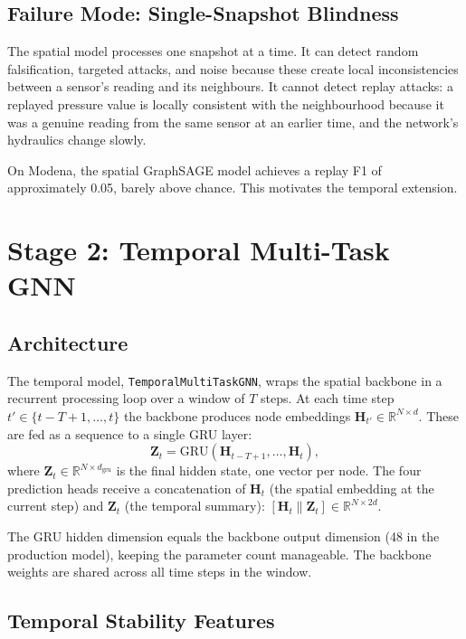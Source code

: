 \subsection{Failure Mode: Single-Snapshot Blindness}

The spatial model processes one snapshot at a time. It can detect
random falsification, targeted attacks, and noise because these
create local inconsistencies between a sensor's reading and its
neighbours. It cannot detect replay attacks: a replayed pressure
value is locally consistent with the neighbourhood because it was a
genuine reading from the same sensor at an earlier time, and the
network's hydraulics change slowly.

On Modena, the spatial GraphSAGE model achieves a replay F1
of approximately 0.05, barely above chance. This motivates the
temporal extension.

\section{Stage 2: Temporal Multi-Task GNN}
\label{sec:temporal_gnn}

\subsection{Architecture}

The temporal model, \texttt{TemporalMultiTaskGNN}, wraps the spatial
backbone in a recurrent processing loop over a window of $T$ steps.
At each time step $t' \in \{t-T+1, \ldots, t\}$ the \gnn{} backbone
produces node embeddings $\mathbf{H}_{t'} \in \mathbb{R}^{N \times d}$.
These are fed as a sequence to a single GRU layer:
\begin{equation}
  \mathbf{Z}_t = \mathrm{GRU}(\mathbf{H}_{t-T+1}, \ldots, \mathbf{H}_t),
\end{equation}
where $\mathbf{Z}_t \in \mathbb{R}^{N \times d_\text{gru}}$ is the
final hidden state, one vector per node. The four prediction heads
receive a concatenation of $\mathbf{H}_t$ (the spatial embedding at
the current step) and $\mathbf{Z}_t$ (the temporal summary):
$[\mathbf{H}_t \| \mathbf{Z}_t] \in \mathbb{R}^{N \times 2d}$.

The GRU hidden dimension equals the backbone output
dimension (48 in the production model), keeping the parameter count
manageable. The backbone weights are shared across all time steps
in the window.

\subsection{Temporal Stability Features}
\label{sec:pattern_features}

